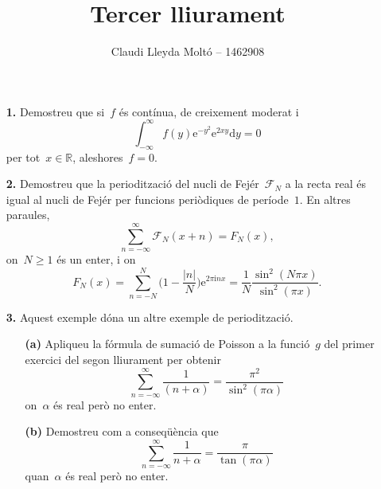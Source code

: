 \documentclass[a4paper]{article}
\title{Tercer lliurament}
\author{Claudi Lleyda Moltó -- 1462908}
\theoremstyle{definition}
\newcommand{\iu}{\mathrm{i}}
\newcommand{\e}{\mathrm{e}}
\providecommand{\uppi}{\pi}
\newcommand{\diff}{\mathrm{d}}
\newcommand{\abs}[1]{\lvert{#1}\rvert}
\newcommand{\F}{\mathcal{F}}
\begin{document}
\maketitle

\begin{enumerate}
    \item[\textbf{1.}] Demostreu que si~\(f\) és contínua, de creixement moderat
        i
        \[
            \int_{-\infty}^{\infty}f(y)\e^{-y^{2}}\e^{2xy}\diff y=0
        \]
        per tot~\(x\in\mathbb{R}\), aleshores~\(f=0\).
\end{enumerate}

\begin{enumerate}
    \item[\textbf{2.}] Demostreu que la periodització del nucli de
        Fejér~\(\F_{N}\) a la recta real és igual al nucli de Fejér per funcions
        periòdiques de període~\(1\).
        En altres paraules,
        \[
            \sum_{n=-\infty}^{\infty} \F_{N}(x+n)
            = F_{N}(x),
        \]
        on~\(N\geq1\) és un enter, i on
        \[
            F_{N}(x) = \sum_{n=-N}^{N} \biggl(1 - \frac{\abs{n}}{N}\biggr)
            \e^{2\uppi\iu nx}
            = \frac{1}{N}\frac{\sin^{2}(N\uppi x)}{\sin^{2}(\uppi x)}.
        \]
\end{enumerate}

\begin{enumerate}
    \item[\textbf{3.}] Aquest exemple dóna un altre exemple de periodització.
        \begin{enumerate}
            \item[\textbf{(a)}] Apliqueu la fórmula de sumació de Poisson a la
                funció~\(g\) del primer exercici del segon lliurament per
                obtenir
                \[
                    \sum_{n=-\infty}^{\infty} \frac{1}{(n+\alpha)}
                    = \frac{\uppi^{2}}{\sin^{2}(\uppi\alpha)}
                \]
                on~\(\alpha\) és real però no enter.
        \end{enumerate}
\end{enumerate}

\begin{enumerate}
    \item[]\begin{enumerate}
        \item[\textbf{(b)}] Demostreu com a conseqüència que
            \begin{equation}
                \label{eq3b}
                \sum_{n=-\infty}^{\infty} \frac{1}{n+\alpha}
                = \frac{\uppi}{\tan(\uppi\alpha)}
            \end{equation}
            quan~\(\alpha\) és real però no enter.
    \end{enumerate}
\end{enumerate}
\end{document}
